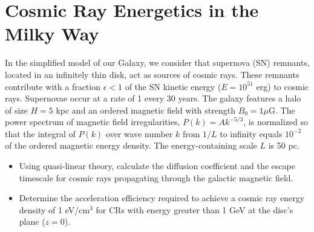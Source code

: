 \section{Cosmic Ray Energetics in the Milky Way}

In the simplified model of our Galaxy, we consider that supernova (SN) remnants, located in an infinitely thin disk, act as sources of cosmic rays. These remnants contribute with a fraction \( \epsilon < 1 \) of the SN kinetic energy (\(E = 10^{51}\) erg) to cosmic rays. Supernovae occur at a rate of 1 every 30 years. The galaxy features a halo of size \(H = 5\) kpc and an ordered magnetic field with strength \(B_0 = 1 \mu\)G. The power spectrum of magnetic field irregularities, \(P(k) = A k^{-5/3}\), is normalized so that the integral of \(P(k)\) over wave number \(k\) from \(1/L\) to infinity equals \(10^{-2}\) of the ordered magnetic energy density. The energy-containing scale \(L\) is 50 pc.

\begin{itemize}
\item Using quasi-linear theory, calculate the diffusion coefficient and the escape timescale for cosmic rays propagating through the galactic magnetic field. 
\item Determine the acceleration efficiency required to achieve a cosmic ray energy density of 1 eV/cm\(^3\) for CRs with energy greater than 1 GeV at the disc's plane (\(z = 0\)).
\end{itemize}
